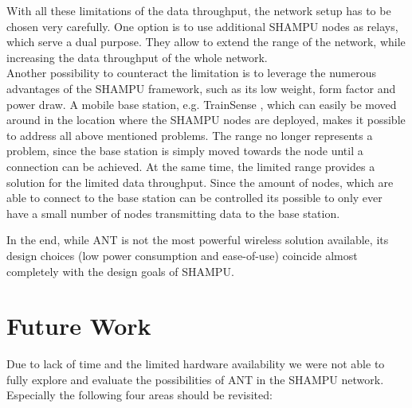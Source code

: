 With all these limitations of the data throughput, the network setup has to be chosen very carefully. One option is to use additional SHAMPU nodes as relays, which serve a dual purpose. They allow to extend the range of the network, while increasing the data throughput of the whole network.\\ Another possibility to counteract the limitation is to leverage the numerous advantages of the SHAMPU framework, such as its low weight, form factor and power draw. A mobile base station, e.g. TrainSense \cite{Smeets:2013:TNI:2450070.2450072}, which can easily be moved around in the location where the SHAMPU nodes are deployed, makes it possible to address all above mentioned problems. The range no longer represents a problem, since the base station is simply moved towards the node until a connection can be achieved. At the same time, the limited range provides a solution for the limited data throughput. Since the amount of nodes, which are able to connect to the base station can be controlled its possible to only ever have a small number of nodes transmitting data to the base station.

In the end, while ANT is not the most powerful wireless solution available, its design choices (low power consumption and ease-of-use) coincide almost completely with the design goals of SHAMPU.
\newpage
\section{Future Work}
\label{sec:future}
Due to lack of time and the limited hardware availability we were not able to fully explore and evaluate the possibilities of ANT in the SHAMPU network. Especially the following four areas should be revisited:

